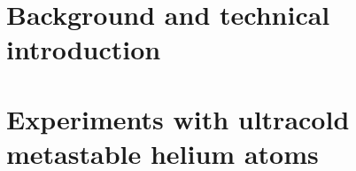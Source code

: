 \documentclass[12pt,a4paper,twoside]{book}
\begin{document}
% 

\frontmatter

\singlespacing



\setcounter{tocdepth}{1}
\tableofcontents


\onehalfspacing

\mainmatter


\part{Background and technical introduction}


% 
\part{Experiments with ultracold metastable helium atoms}





\appendix


\backmatter



\singlespacing
\printbibliography
\end{document}
